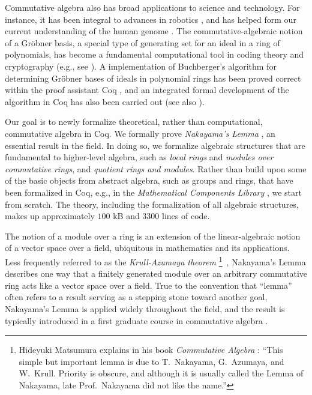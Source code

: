 \documentclass{article}
\begin{document}
Commutative algebra also has broad applications to science and technology. For
instance, it has been integral to advances in robotics \cite{cox-little-oshea},
and has helped form our current understanding of the human genome
\cite{genetic-algebra}. The commutative-algebraic notion of a Gr\"{o}bner
basis, a special type of generating set for an ideal in a ring of polynomials,
has become a fundamental computational tool in coding theory and cryptography
(e.g., see  \cite{grobner-bases-cryptography}). A implementation of
Buchberger's algorithm \cite{buchberger} for determining Gr\"obner bases of
ideals in polynomial rings has been proved correct within the proof assistant
Coq \cite{the_coq_development_team_2019_3476303,thery-buchberger}, and an
integrated formal development of the algorithm in Coq has also been carried out
\cite{persson2001integrated} (see also \cite{grobner-type-theory}). 

Our goal is to newly formalize theoretical, rather than computational,
commutative algebra in Coq. We formally prove \emph{Nakayama's Lemma}
\cite{nakayama-1951, azumaya}, an essential result in the field. In doing so,
we formalize algebraic structures that are fundamental to higher-level algebra,
such as \emph{local rings} and \emph{modules over commutative rings}, and
\emph{quotient rings and modules}. Rather than build upon some of the basic
objects from abstract algebra, such as groups and rings, that have been
formalized in Coq, e.g., in the \emph{Mathematical Components Library}
\cite{mathcomp}, we start from scratch.
The theory, including the formalization of all algebraic structures, makes up
approximately $100$ kB and 3300 lines of code.
 
The notion of a module over a ring is an extension of the linear-algebraic
notion of a vector space over a field, ubiquitous in mathematics and its
applications. Less frequently referred to as the \emph{Krull-Azumaya theorem}
\footnote{Hideyuki Matsumura explains in his book \emph{Commutative Algebra}
  \cite{matsumura}: ``{This simple but important lemma is due to T.\ Nakayama,
  G.\ Azumaya, and W.\ Krull. Priority is obscure, and although it is usually
  called the Lemma of Nakayama, late Prof.\  Nakayama did not like the
  name.''}}
\,\cite{nagata}, Nakayama's Lemma describes one way that a finitely generated
module over an arbitrary commutative ring acts like a vector space over a
field. True to the convention that ``lemma'' often refers to a result serving
as a stepping stone toward another goal, Nakayama's Lemma is applied widely
throughout the field, and the result is typically introduced in a first
graduate course in commutative algebra \cite{atiyah-macdonald, matsumura,
eisenbud}.
\end{document}
